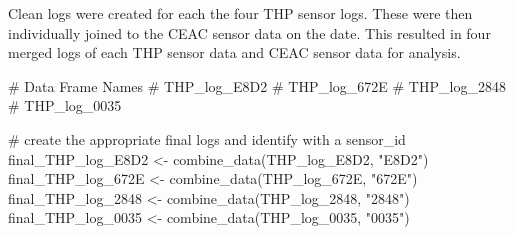 \documentclass[
  letterpaper,
  DIV=11,
  numbers=noendperiod]{scrartcl}
\newenvironment{Shaded}{\begin{snugshade}}{\end{snugshade}}
\newcommand{\AttributeTok}[1]{\textcolor[rgb]{0.40,0.45,0.13}{#1}}
\newcommand{\CommentTok}[1]{\textcolor[rgb]{0.37,0.37,0.37}{#1}}
\newcommand{\DocumentationTok}[1]{\textcolor[rgb]{0.37,0.37,0.37}{\textit{#1}}}
\newcommand{\FunctionTok}[1]{\textcolor[rgb]{0.28,0.35,0.67}{#1}}
\newcommand{\NormalTok}[1]{\textcolor[rgb]{0.00,0.23,0.31}{#1}}
\newcommand{\OtherTok}[1]{\textcolor[rgb]{0.00,0.23,0.31}{#1}}
\newcommand{\SpecialCharTok}[1]{\textcolor[rgb]{0.37,0.37,0.37}{#1}}
\newcommand{\StringTok}[1]{\textcolor[rgb]{0.13,0.47,0.30}{#1}}
\begin{document}
\begin{Shaded}
\end{Shaded}

Clean logs were created for each the four THP sensor logs. These were
then individually joined to the CEAC sensor data on the date. This
resulted in four merged logs of each THP sensor data and CEAC sensor
data for analysis.

\begin{Shaded}
\begin{Highlighting}[]
\CommentTok{\# Data Frame Names}
\CommentTok{\#   THP\_log\_E8D2}
\CommentTok{\#   THP\_log\_672E}
\CommentTok{\#   THP\_log\_2848}
\CommentTok{\#   THP\_log\_0035}

\CommentTok{\# create the appropriate final logs and identify with a sensor\_id}
\NormalTok{final\_THP\_log\_E8D2 }\OtherTok{\textless{}{-}} \FunctionTok{combine\_data}\NormalTok{(THP\_log\_E8D2, }\StringTok{"E8D2"}\NormalTok{)}
\NormalTok{final\_THP\_log\_672E }\OtherTok{\textless{}{-}} \FunctionTok{combine\_data}\NormalTok{(THP\_log\_672E, }\StringTok{"672E"}\NormalTok{)}
\NormalTok{final\_THP\_log\_2848 }\OtherTok{\textless{}{-}} \FunctionTok{combine\_data}\NormalTok{(THP\_log\_2848, }\StringTok{"2848"}\NormalTok{)}
\NormalTok{final\_THP\_log\_0035 }\OtherTok{\textless{}{-}} \FunctionTok{combine\_data}\NormalTok{(THP\_log\_0035, }\StringTok{"0035"}\NormalTok{)}
\end{Highlighting}
\end{Shaded}
\end{document}
